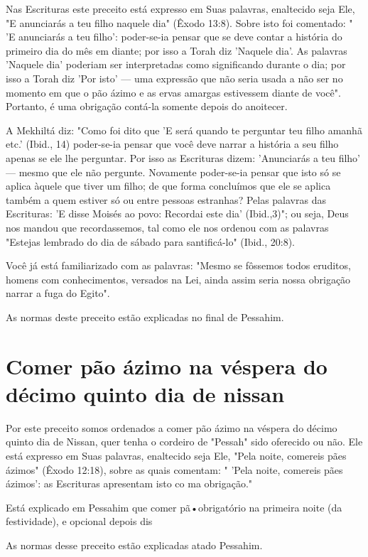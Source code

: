 \begin{itemize}
\begin{enumrate}
\begin{itemize}
\begin{itemize}
\begin{itemize}
Nas Escrituras este preceito está expresso em Suas palavras, enalteci­do
seja Ele, "E anunciarás a teu filho naquele dia" (Êxodo 13:8). Sobre
isto foi comentado: " 'E anunciarás a teu filho': poder-se-ia pensar que
se deve contar a história do primeiro dia do mês em diante; por isso a
Torah diz 'Naquele dia'. As palavras 'Naquele dia' poderiam ser
interpretadas como significando duran­te o dia; por isso a Torah diz
'Por isto' --- uma expressão que não seria usada a não ser no momento em
que o pão ázimo e as ervas amargas estivessem dian­te de você".
Portanto, é uma obrigação contá-la somente depois do anoitecer.

A Mekhiltá diz: "Como foi dito que 'E será quando te perguntar teu filho
amanhã etc.' (Ibid., 14) poder-se-ia pensar que você deve narrar a
história a seu filho apenas se ele lhe perguntar. Por isso as Escrituras
dizem: 'Anunciarás a teu filho' --- mesmo que ele não pergunte.
Novamente poder-se-ia pensar que isto só se aplica àquele que tiver um
filho; de que forma concluímos que ele se aplica também a quem estiver
só ou entre pessoas estranhas? Pelas palavras das Escrituras: 'E disse
Moisés ao povo: Recordai este dia' (Ibid.,3)"; ou seja, Deus nos mandou
que recordassemos, tal como ele nos ordenou com as pala­vras "Estejas
lembrado do dia de sábado para santificá-lo" (Ibid., 20:8).

Você já está familiarizado com as palavras: "Mesmo se fôssemos to­dos
eruditos, homens com conhecimentos, versados na Lei, ainda assim seria
nossa obrigação narrar a fuga do Egito".


As normas deste preceito estão explicadas no final de Pessahim.


\section{Comer pão ázimo na véspera do décimo quinto dia de nissan}

Por este preceito somos ordenados a comer pão ázimo na véspera do décimo
quinto dia de Nissan, quer tenha o cordeiro de "Pessah" sido oferecido ou não. Ele está expresso em Suas palavras, enaltecido seja Ele,
"Pela noi­te, comereis pães ázimos" (Êxodo 12:18), sobre as quais
comentam: " 'Pela noite, comereis pães ázimos': as Escrituras apresentam
isto co ma obrigação."

Está explicado em Pessahim que comer pã•obrigatório na primeira noite
(da festividade), e opcional depois dis

As normas desse preceito estão explicadas atado Pessahim.


\end{itemize}
\end{itemize}
\end{itemize}
\end{enumrate}
\end{itemize}
